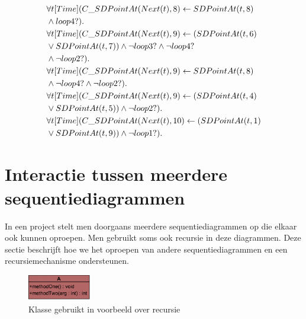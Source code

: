 \begin{align*}
	&\forall{t}[Time](C\_SDPointAt(Next(t), 8) \leftarrow SDPointAt(t, 8) \\ &\land loop4?). \\
	&\forall{t}[Time](C\_SDPointAt(Next(t), 9) \leftarrow (SDPointAt(t, 6) \\ &\lor SDPointAt(t, 7)) \land \lnot loop3? \land \lnot loop4? \\ &\land \lnot loop2?). \\
	&\forall{t}[Time](C\_SDPointAt(Next(t), 9) \leftarrow SDPointAt(t, 8) \\ &\land \lnot loop4? \land \lnot loop2?). \\
	&\forall{t}[Time](C\_SDPointAt(Next(t), 9) \leftarrow (SDPointAt(t, 4) \\ &\lor SDPointAt(t, 5)) \land \lnot loop2?). \\
	&\forall{t}[Time](C\_SDPointAt(Next(t), 10) \leftarrow (SDPointAt(t, 1) \\ &\lor SDPointAt(t, 9)) \land \lnot loop1?).
\end{align*}

\section{Interactie tussen meerdere sequentiediagrammen}\label{sec:interaction}
In een project stelt men doorgaans meerdere sequentiediagrammen op die elkaar ook kunnen oproepen. Men gebruikt soms ook recursie in deze diagrammen. Deze sectie beschrijft hoe we het oproepen van andere sequentiediagrammen en een recursiemechanisme ondersteunen.

\begin{figure}
	\centering
	\includegraphics[width=0.25\textwidth]{chap-gedrag/recursion-class.png}
	\caption{Klasse gebruikt in voorbeeld over recursie}
	\label{fig:recursion-class}
\end{figure}


